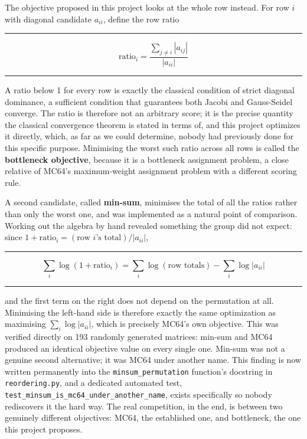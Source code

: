 \documentclass[11pt,a4paper]{article}
\newcommand{\code}[1]{\texttt{\footnotesize #1}}
\newenvironment{formulabox}
  {\begin{center}\color{SBteal}\rule{0.92\linewidth}{0.8pt}\par\vspace{5pt}\color{SBnavy}}
  {\par\vspace{3pt}\color{SBteal}\rule{0.92\linewidth}{0.8pt}\end{center}}
\begin{document}
The objective proposed in this project looks at the whole row instead. For row $i$ with
diagonal candidate $a_{ii}$, define the row ratio

\begin{formulabox}
$$\text{ratio}_i = \frac{\sum_{j \neq i} |a_{ij}|}{|a_{ii}|}$$
\end{formulabox}

A ratio below 1 for every row is exactly the classical condition of strict diagonal
dominance, a sufficient condition that guarantees both Jacobi and Gauss-Seidel converge.
The ratio is therefore not an arbitrary score; it is the precise quantity the classical
convergence theorem is stated in terms of, and this project optimizes it directly, which,
as far as we could determine, nobody had previously done for this specific purpose.
Minimising the worst such ratio across all rows is called the \textbf{bottleneck
objective}, because it is a bottleneck assignment problem, a close relative of MC64's
maximum-weight assignment problem with a different scoring rule.

A second candidate, called \textbf{min-sum}, minimises the total of all the ratios rather
than only the worst one, and was implemented as a natural point of comparison. Working
out the algebra by hand revealed something the group did not expect: since
$1+\text{ratio}_i = (\text{row } i\text{'s total}) / |a_{ii}|$,

\begin{formulabox}
$$\sum_i \log(1+\text{ratio}_i) = \sum_i \log(\text{row totals}) - \sum_i \log|a_{ii}|$$
\end{formulabox}

and the first term on the right does not depend on the permutation at all. Minimising the
left-hand side is therefore exactly the same optimization as maximising
$\sum_i \log|a_{ii}|$, which is precisely MC64's own objective. This was verified directly
on 193 randomly generated matrices: min-sum and MC64 produced an identical objective value
on every single one. Min-sum was not a genuine second alternative; it was MC64 under
another name. This finding is now written permanently into the \code{minsum\_permutation}
function's docstring in \code{reordering.py}, and a dedicated automated test,
\code{test\_minsum\_is\_mc64\_under\_another\_name}, exists specifically so nobody
rediscovers it the hard way. The real competition, in the end, is between two genuinely
different objectives: MC64, the established one, and bottleneck, the one this project
proposes.
\end{document}
